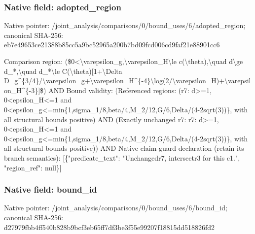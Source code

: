 \documentclass[10pt,a4paper]{article}
\begin{document}
\subsubsection{Native field: adopted\_\allowbreak{}region}
Native pointer: /joint\_\allowbreak{}analysis/comparisons/0/bound\_\allowbreak{}uses/6/adopted\_\allowbreak{}region; canonical SHA-256: eb7e49653ce21388b85cc5a9bc52965a200b7bd09fcd006cd9faf21e88901cc6

\begingroup\raggedright\sloppy Comparison region:\allowbreak{} (\$0<\textbackslash{}varepsilon\_\allowbreak{}g,\allowbreak{}\textbackslash{}varepsilon\_\allowbreak{}H\textbackslash{}le c(\textbackslash{}theta),\allowbreak{}\textbackslash{}quad d\textbackslash{}ge d\_\allowbreak{}*,\allowbreak{}\textbackslash{}quad d\_\allowbreak{}*\textbackslash{}le C(\textbackslash{}theta)[1+\textbackslash{}Delta D\_\allowbreak{}g\textasciicircum{}\{3/\allowbreak{}4\}/\allowbreak{}\textbackslash{}varepsilon\_\allowbreak{}g+\textbackslash{}varepsilon\_\allowbreak{}H\textasciicircum{}\{-4\}\textbackslash{}log(2/\allowbreak{}\textbackslash{}varepsilon\_\allowbreak{}H)+\textbackslash{}varepsilon\_\allowbreak{}H\textasciicircum{}\{-3\}]\$) AND Bound validity:\allowbreak{} (Referenced regions:\allowbreak{} (r7:\allowbreak{} d>=\allowbreak{}1,\allowbreak{} 0<epsilon\_\allowbreak{}H<=\allowbreak{}1 and 0<epsilon\_\allowbreak{}g<=\allowbreak{}min\{1,\allowbreak{}sigma\_\allowbreak{}1/\allowbreak{}8,\allowbreak{}beta/\allowbreak{}4,\allowbreak{}M\_\allowbreak{}2/\allowbreak{}12,\allowbreak{}G/\allowbreak{}6,\allowbreak{}Delta/\allowbreak{}(4-2sqrt(3))\},\allowbreak{} with all structural bounds positive) AND (Exactly unchanged r7:\allowbreak{} r7:\allowbreak{} d>=\allowbreak{}1,\allowbreak{} 0<epsilon\_\allowbreak{}H<=\allowbreak{}1 and 0<epsilon\_\allowbreak{}g<=\allowbreak{}min\{1,\allowbreak{}sigma\_\allowbreak{}1/\allowbreak{}8,\allowbreak{}beta/\allowbreak{}4,\allowbreak{}M\_\allowbreak{}2/\allowbreak{}12,\allowbreak{}G/\allowbreak{}6,\allowbreak{}Delta/\allowbreak{}(4-2sqrt(3))\},\allowbreak{} with all structural bounds positive)) AND Native claim-guard declaration (retain its branch semantics):\allowbreak{} [\{"predicate\_\allowbreak{}text":\allowbreak{} "Unchangedr7,\allowbreak{} intersectr3 for this c1.",\allowbreak{} "region\_\allowbreak{}ref":\allowbreak{} null\}]\par\endgroup

\subsubsection{Native field: bound\_\allowbreak{}id}
Native pointer: /joint\_\allowbreak{}analysis/comparisons/0/bound\_\allowbreak{}uses/6/bound\_\allowbreak{}id; canonical SHA-256: d27979fbb4ff540b828b9bcf3eb65ff7df3be3f55e99207f18815dd518826fd2
\end{document}
